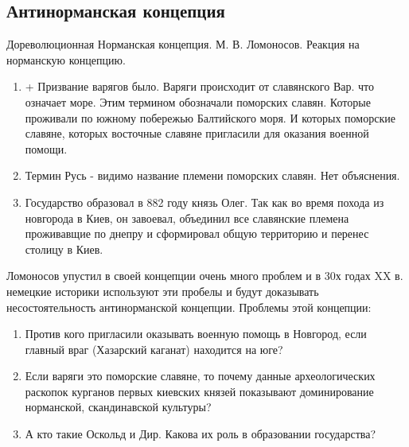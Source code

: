 \documentclass[a4paper]{article}
\begin{document}
\subsection{Антинорманская концепция}
Дореволюционная Норманская концепция. М. В. Ломоносов.
Реакция на норманскую концепцию.
\begin{enumerate}
    \item + Призвание варягов было. Варяги происходит от славянского Вар. что означает море. Этим термином обозначали поморских славян. Которые проживали по южному побережью Балтийского моря. И которых поморские славяне, которых восточные славяне пригласили для оказания военной помощи.
    \item Термин Русь - видимо название племени поморских славян. Нет объяснения.
    \item Государство образовал в 882 году князь Олег. Так как во время похода из новгорода в Киев, он завоевал, объединил все славянские племена проживавщие по днепру и сформировал общую территорию и перенес столицу в Киев.
\end{enumerate}
Ломоносов упустил в своей концепции очень много проблем и в 30х годах XX в. немецкие историки используют эти пробелы и будут доказывать несостоятельность антинорманской концепции.
Проблемы этой концепции:
\begin{enumerate}
    \item Против кого пригласили оказывать военную помощь в Новгород, если главный враг (Хазарский каганат) находится на юге?
    \item Если варяги это поморские славяне, то почему данные археологических раскопок курганов первых киевских князей показывают доминирование норманской, скандинавской культуры?
    \item А кто такие Оскольд и Дир. Какова их роль в образовании государства?
\end{enumerate}
\end{document}
